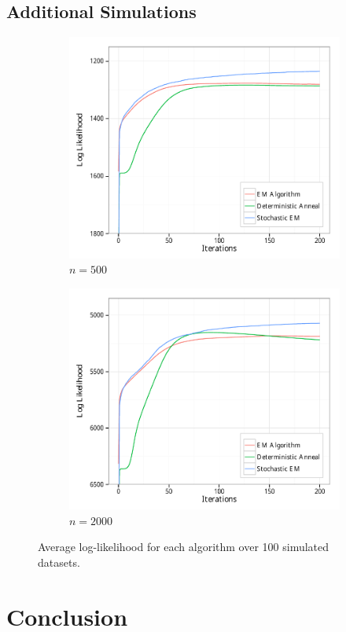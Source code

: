 \documentclass{article}
\theoremstyle{definition}
\theoremstyle{algodesc}
\begin{document}
\subsection{Additional Simulations}


\begin{figure}[htb] \centering
  \begin{subfigure}[t]{.45\linewidth}
    \includegraphics[width=\linewidth]{include/avg_lik_500.pdf}
    \caption{$n=500$} \label{fig:sims_n500}
  \end{subfigure}
  \begin{subfigure}[t]{.45\linewidth}
    \includegraphics[width=\linewidth]{include/avg_lik_2000.pdf}
    \caption{$n=2000$} \label{fig:sims_n2000}
  \end{subfigure}
  \caption{Average log-likelihood for each algorithm over 100 simulated datasets.}
  \label{fig:sims}
\end{figure}


\section{Conclusion} \label{sec:conclusion}





\end{document}
